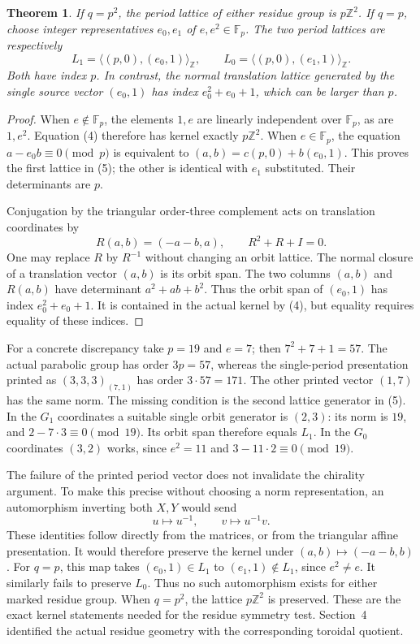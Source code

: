 \documentclass[11pt,a4paper]{article}
\newtheorem{theorem}{Theorem}
\newcommand{\gen}[1]{\langle #1\rangle}
\newcommand{\F}{\mathbb F}
\newcommand{\Z}{\mathbb Z}
\begin{document}
\begin{theorem}\label{periods}
If $q=p^2$, the period lattice of either residue group is
$p\Z^2$. If $q=p$, choose integer representatives $e_0,e_1$ of
$e,e^2\in\F_p$. The two period lattices are respectively
\[
 L_1=\gen{(p,0),(e_0,1)}_{\Z},\qquad
 L_0=\gen{(p,0),(e_1,1)}_{\Z}.                              \tag{5}
\]
Both have index $p$. In contrast, the normal translation lattice
generated by the single source vector $(e_0,1)$ has index
$e_0^2+e_0+1$, which can be larger than $p$.
\end{theorem}
\begin{proof}
When $e\notin\F_p$, the elements $1,e$ are linearly independent
over $\F_p$, as are $1,e^2$. Equation (4) therefore has kernel
exactly $p\Z^2$. When $e\in\F_p$, the equation
$a-e_0b\equiv0\pmod p$ is equivalent to
$(a,b)=c(p,0)+b(e_0,1)$. This proves the first lattice in (5);
the other is identical with $e_1$ substituted. Their determinants
are $p$.

Conjugation by the triangular order-three complement acts on
translation coordinates by
\[
                R(a,b)=(-a-b,a),\qquad R^2+R+I=0.
\]
One may replace $R$ by $R^{-1}$ without changing an orbit lattice.
The normal closure of a translation vector $(a,b)$ is its orbit
span. The two columns $(a,b)$ and $R(a,b)$ have determinant
$a^2+ab+b^2$. Thus the orbit span of $(e_0,1)$ has index
$e_0^2+e_0+1$. It is contained in the actual kernel by (4),
but equality requires equality of these indices.
\end{proof}

For a concrete discrepancy take $p=19$ and $e=7$; then
$7^2+7+1=57$. The actual parabolic group has order $3p=57$,
whereas the single-period presentation printed as $(3,3,3)_{(7,1)}$
has order $3\cdot57=171$. The other printed vector $(1,7)$ has
the same norm. The missing condition is the second lattice
generator in (5). In the $G_1$ coordinates a suitable single
orbit generator is $(2,3)$: its norm is $19$, and
$2-7\cdot3\equiv0\pmod{19}$. Its orbit span therefore equals
$L_1$. In the $G_0$ coordinates $(3,2)$ works, since $e^2=11$
and $3-11\cdot2\equiv0\pmod{19}$.

The failure of the printed period vector does not invalidate the
chirality argument. To make this precise without choosing a norm
representation, an automorphism inverting both $X,Y$ would send
\[
                        u\longmapsto u^{-1},\qquad
                        v\longmapsto u^{-1}v.
\]
These identities follow directly from the matrices, or from the
triangular affine presentation. It would therefore preserve the
kernel under $(a,b)\mapsto(-a-b,b)$. For $q=p$, this map takes
$(e_0,1)\in L_1$ to $(e_1,1)\notin L_1$, since $e^2\ne e$.
It similarly fails to preserve $L_0$. Thus no such automorphism
exists for either marked residue group. When $q=p^2$, the lattice
$p\Z^2$ is preserved. These are the exact kernel statements needed
for the residue symmetry test. Section~4 identified the actual
residue geometry with the corresponding toroidal quotient.
\end{document}
